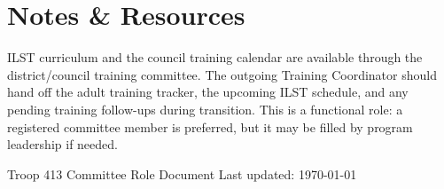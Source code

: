 \documentclass[11pt, letterpaper]{article}
\begin{document}
\vspace{0.6em}

\section{Notes \& Resources}
ILST curriculum and the council training calendar are available through the district/council training committee. The outgoing Training Coordinator should hand off the adult training tracker, the upcoming ILST schedule, and any pending training follow-ups during transition. This is a functional role: a registered committee member is preferred, but it may be filled by program leadership if needed.

\vfill
\begin{center}
  \footnotesize\color{gray}
  Troop 413 \textbullet{} Committee Role Document \textbullet{} Last updated: \today
\end{center}
\end{document}

